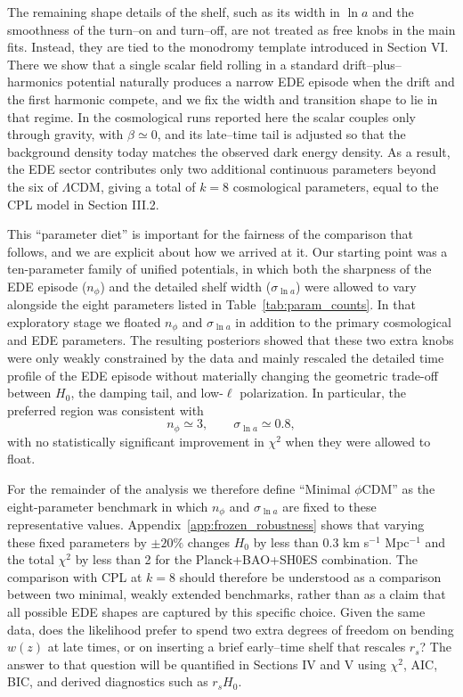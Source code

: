 \documentclass[a4paper,11pt]{article}
\begin{document}
The remaining shape details of the shelf, such as its width in $\ln a$ and the smoothness of the turn--on and turn--off, are not treated as free knobs in the main fits. Instead, they are tied to the monodromy template introduced in Section VI. There we show that a single scalar field rolling in a standard drift--plus--harmonics potential naturally produces a narrow EDE episode when the drift and the first harmonic compete, and we fix the width and transition shape to lie in that regime. In the cosmological runs reported here the scalar couples only through gravity, with $\beta \simeq 0$, and its late--time tail is adjusted so that the background density today matches the observed dark energy density. As a result, the EDE sector contributes only two additional continuous parameters beyond the six of $\Lambda$CDM, giving a total of $k = 8$ cosmological parameters, equal to the CPL model in Section III.2.

This ``parameter diet'' is important for the fairness of the comparison that follows, and we are explicit about how we arrived at it. Our starting point was a ten-parameter family of unified potentials, in which both the sharpness of the EDE episode ($n_\phi$) and the detailed shelf width ($\sigma_{\ln a}$) were allowed to vary alongside the eight parameters listed in Table~\ref{tab:param_counts}. In that exploratory stage we floated $n_\phi$ and $\sigma_{\ln a}$ in addition to the primary cosmological and EDE parameters. The resulting posteriors showed that these two extra knobs were only weakly constrained by the data and mainly rescaled the detailed time profile of the EDE episode without materially changing the geometric trade-off between $H_0$, the damping tail, and low-$\ell$ polarization. In particular, the preferred region was consistent with
\begin{equation}
n_\phi \simeq 3, \qquad \sigma_{\ln a} \simeq 0.8,
\end{equation}
with no statistically significant improvement in $\chi^2$ when they were allowed to float.

For the remainder of the analysis we therefore define ``Minimal $\phi$CDM'' as the eight-parameter benchmark in which $n_\phi$ and $\sigma_{\ln a}$ are fixed to these representative values. Appendix~\ref{app:frozen_robustness} shows that varying these fixed parameters by $\pm 20\%$ changes $H_0$ by less than 0.3 km s$^{-1}$ Mpc$^{-1}$ and the total $\chi^2$ by less than 2 for the Planck+BAO+SH0ES combination. The comparison with CPL at $k = 8$ should therefore be understood as a comparison between two minimal, weakly extended benchmarks, rather than as a claim that all possible EDE shapes are captured by this specific choice. Given the same data, does the likelihood prefer to spend two extra degrees of freedom on bending $w(z)$ at late times, or on inserting a brief early--time shelf that rescales $r_s$? The answer to that question will be quantified in Sections IV and V using $\chi^2$, AIC, BIC, and derived diagnostics such as $r_s H_0$.
\end{document}

